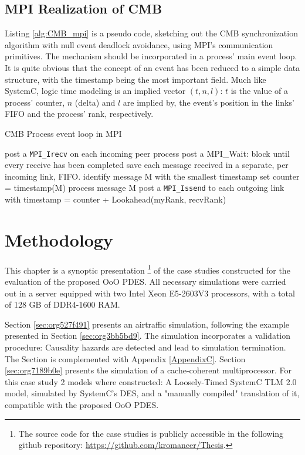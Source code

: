 \documentclass[11pt]{article}
\begin{document}
\subsection{MPI Realization of CMB}
\label{sec:org7e0e641}
Listing \ref{alg:CMB_mpi} is a pseudo code, sketching out the CMB synchronization algorithm with null event deadlock avoidance, using MPI's communication primitives.
The mechanism should be incorporated in a process' main event loop.
It is quite obvious that the concept of an event has been reduced to a simple data structure, with the timestamp being the most important field.
Much like SystemC, logic time modeling is an implied vector \((t,n,l)\): \(t\) is the value of a process' counter, \(n\) (delta) and \(l\) are implied by, the event's position in the links' FIFO and the process' rank, respectively.
\begin{LATEX}
\begin{algorithm}
\caption{CMB Process event loop in MPI}
\label{alg:CMB_mpi}
\begin{algorithmic}[2]

      \State post a \texttt{MPI\_Irecv} on each incoming peer process
      \State post a MPI\_Wait: block until every receive has been completed
      \State save each message received in a separate, per incoming link, FIFO.
      \State identify message M with the smallest timestamp
      \State set counter = timestamp(M)
      \State process message M
      \State post a \texttt{MPI\_Issend} to each outgoing link with timestamp = counter + Lookahead(myRank, recvRank)
   \EndWhile

\end{algorithmic}
\end{algorithm}
\end{LATEX}


\clearpage

\section{Methodology}
\label{sec:org1d9dc6c}
This chapter is a synoptic presentation \footnote{The source code for the case studies is publicly accessible in the following github repository: \url{https://github.com/kromancer/Thesis}.} of the case studies constructed for the evaluation of the proposed OoO PDES.
All necessary simulations were carried out in a server equipped with two Intel Xeon E5-2603V3 processors, with a total of 128 GB of DDR4-1600 RAM.

Section \ref{sec:org527f491} presents an airtraffic simulation, following the example presented in Section \ref{sec:org3bb5bd9}.
The simulation incorporates a validation procedure: Causality hazards are detected and lead to simulation termination.
The Section is complemented with Appendix \ref{AppendixC}.
Section \ref{sec:org7189b0e} presents the simulation of a cache-coherent multiprocessor.
For this case study 2 models where constructed: A Loosely-Timed SystemC TLM 2.0 model, simulated by SystemC's DES, 
and a "manually compiled" translation of it, compatible with the proposed OoO PDES.
\end{document}
